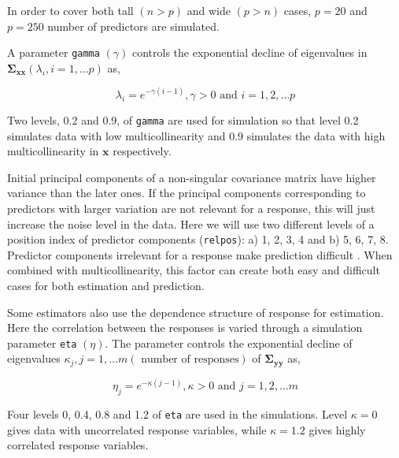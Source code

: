 \documentclass[12pt,3p,authoryear]{elsarticle}
\providecommand{\tightlist}{%
  \setlength{\itemsep}{0pt}\setlength{\parskip}{0pt}}
\begin{document}
\begin{description}
\tightlist
\item[\textbf{Number of predictors: (\texttt{p})}]
In order to cover both tall \((n>p)\) and wide \((p>n)\) cases,
\(p= 20\) and \(p= 250\) number of predictors are simulated.
\item[\textbf{Multicollinearity in predictor variables:
(\texttt{gamma})}]
A parameter \texttt{gamma} \((\gamma)\) controls the exponential decline
of eigenvalues in
\(\boldsymbol{\Sigma_{xx}} (\lambda_i, i = 1, \ldots p)\) as,

\begin{equation}
  \lambda_i = e^{-\gamma(i-1)}, \gamma > 0 \text{ and } i = 1, 2, \ldots p
  \label{eq:gamma}
  \end{equation}

Two levels, 0.2 and 0.9, of \texttt{gamma} are used for simulation so
that level 0.2 simulates data with low multicollinearity and 0.9
simulates the data with high multicollinearity in \(\mathbf{x}\)
respectively.
\item[\textbf{Position of relevant components: (\texttt{relpos})}]
Initial principal components of a non-singular covariance matrix have
higher variance than the later ones. If the principal components
corresponding to predictors with larger variation are not relevant for a
response, this will just increase the noise level in the data. Here we
will use two different levels of a position index of predictor
components (\texttt{relpos}): a) 1, 2, 3, 4 and b) 5, 6, 7, 8. Predictor
components irrelevant for a response make prediction difficult
\citep{Helland1994b}. When combined with multicollinearity, this factor
can create both easy and difficult cases for both estimation and
prediction.
\item[\textbf{Correlation in response variables: (\texttt{eta})}]
Some estimators also use the dependence structure of response for
estimation. Here the correlation between the responses is varied through
a simulation parameter \texttt{eta} \((\eta)\). The parameter controls
the exponential decline of eigenvalues
\(\kappa_j, j = 1, \ldots m (\text{ number of responses})\) of
\(\boldsymbol{\Sigma_{yy}}\) as,

\begin{equation}
\eta_j = e^{-\kappa(j-1)}, \kappa > 0 \text{ and } j = 1, 2, \ldots m
\label{eq:eta}
\end{equation}

Four levels 0, 0.4, 0.8 and 1.2 of \texttt{eta} are used in the
simulations. Level \(\kappa=0\) gives data with uncorrelated response
variables, while \(\kappa=1.2\) gives highly correlated response
variables.
\end{description}
\end{document}
